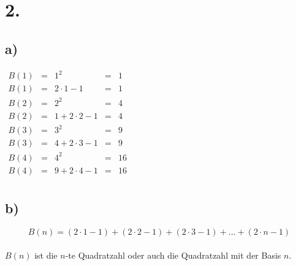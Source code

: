 \documentclass[a4paper]{scrartcl}
\begin{document}
		

\section{2.}
	\subsection{a)}
		\(
		\begin{array}{lclcl}
			B(1)&=&1^2&=&1 \\
			B(1)&=&2\cdot 1-1&=&1 \\
			B(2)&=&2^2&=&4 \\
			B(2)&=&1+2\cdot 2-1&=&4 \\
			B(3)&=&3^2&=&9 \\
			B(3)&=&4+2\cdot 3-1&=&9 \\
			B(4)&=&4^2&=&16 \\
			B(4)&=&9+2\cdot 4-1&=&16 \\
		\end{array}
		\)		
		
	\subsection{b)}
		\[B(n)=(2\cdot 1-1)+(2\cdot 2-1)+(2\cdot 3-1)+... +(2\cdot n-1)\] \\
		\(B(n)\) ist die \(n\)-te Quadratzahl oder auch die Quadratzahl mit der Basis \(n\).
\end{document}
